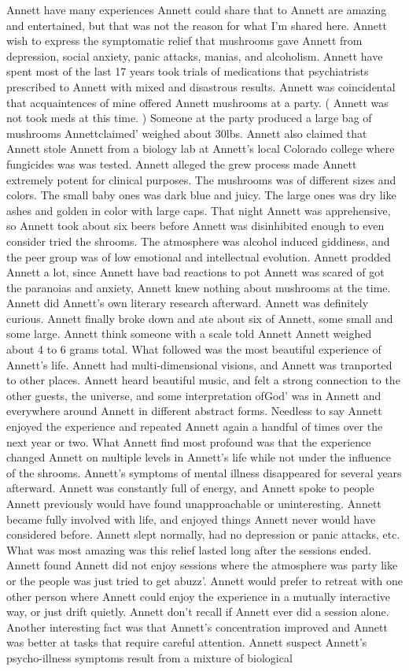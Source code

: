\documentclass[12pt]{book}
\begin{document}
Annett have many experiences Annett could share that to Annett are amazing and entertained, but that was not the reason for what I'm shared here. Annett wish to express the symptomatic relief that mushrooms gave Annett from depression, social anxiety, panic attacks, manias, and alcoholism. Annett have spent most of the last 17 years took trials of medications that psychiatrists prescribed to Annett with mixed and disastrous results. Annett was coincidental that acquaintences of mine offered Annett mushrooms at a party. ( Annett was not took meds at this time. ) Someone at the party produced a large bag of mushrooms Annettclaimed' weighed about 30lbs. Annett also claimed that Annett stole Annett from a biology lab at Annett's local Colorado college where fungicides was was tested. Annett alleged the grew process made Annett extremely potent for clinical purposes. The mushrooms was of different sizes and colors. The small baby ones was dark blue and juicy. The large ones was dry like ashes and golden in color with large caps. That night Annett was apprehensive, so Annett took about six beers before Annett was disinhibited enough to even consider tried the shrooms. The atmosphere was alcohol induced giddiness, and the peer group was of low emotional and intellectual evolution. Annett prodded Annett a lot, since Annett have bad reactions to pot Annett was scared of got the paranoias and anxiety, Annett knew nothing about mushrooms at the time. Annett did Annett's own literary research afterward. Annett was definitely curious. Annett finally broke down and ate about six of Annett, some small and some large. Annett think someone with a scale told Annett Annett weighed about 4 to 6 grams total. What followed was the most beautiful experience of Annett's life. Annett had multi-dimensional visions, and Annett was tranported to other places. Annett heard beautiful music, and felt a strong connection to the other guests, the universe, and some interpretation ofGod' was in Annett and everywhere around Annett in different abstract forms. Needless to say Annett enjoyed the experience and repeated Annett again a handful of times over the next year or two. What Annett find most profound was that the experience changed Annett on multiple levels in Annett's life while not under the influence of the shrooms. Annett's symptoms of mental illness disappeared for several years afterward. Annett was constantly full of energy, and Annett spoke to people Annett previously would have found unapproachable or uninteresting. Annett became fully involved with life, and enjoyed things Annett never would have considered before. Annett slept normally, had no depression or panic attacks, etc. What was most amazing was this relief lasted long after the sessions ended. Annett found Annett did not enjoy sessions where the atmosphere was party like or the people was just tried to get abuzz'. Annett would prefer to retreat with one other person where Annett could enjoy the experience in a mutually interactive way, or just drift quietly. Annett don't recall if Annett ever did a session alone. Another interesting fact was that Annett's concentration improved and Annett was better at tasks that require careful attention. Annett suspect Annett's psycho-illness symptoms result from a mixture of biological 
\end{document}
